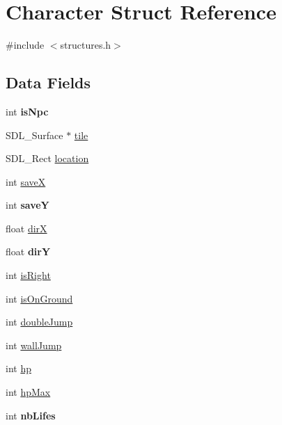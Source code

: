\hypertarget{struct_character}{\section{Character Struct Reference}
\label{struct_character}
}


{\ttfamily \#include $<$structures.\-h$>$}

\subsection*{Data Fields}
\begin{DoxyCompactItemize}
\item 
\hypertarget{struct_character_a9ffc306de2b2ce522b1d1908accd5938}{int {\bfseries is\-Npc}}\label{struct_character_a9ffc306de2b2ce522b1d1908accd5938}

\item 
S\-D\-L\-\_\-\-Surface $\ast$ \hyperlink{struct_character_a36a8f1f7bc9c241b9926d97b82811407}{tile}
\item 
S\-D\-L\-\_\-\-Rect \hyperlink{struct_character_a08e7ab1c2395b84bea7ca13eb99bac60}{location}
\item 
int \hyperlink{struct_character_a72c195fb4fffc6a9267fffce902bf641}{save\-X}
\item 
\hypertarget{struct_character_a5cb5844063a443a2bc538124f0709b13}{int {\bfseries save\-Y}}\label{struct_character_a5cb5844063a443a2bc538124f0709b13}

\item 
float \hyperlink{struct_character_ab1761c91e3594dec827fe60e992d2e1a}{dir\-X}
\item 
\hypertarget{struct_character_a72324d3d2f391a353c57aaa03b148d8d}{float {\bfseries dir\-Y}}\label{struct_character_a72324d3d2f391a353c57aaa03b148d8d}

\item 
int \hyperlink{struct_character_ac73a92163fd55152d03d0aaca5093b72}{is\-Right}
\item 
int \hyperlink{struct_character_aa4061d19d285d0ef281f333dee8f9a00}{is\-On\-Ground}
\item 
int \hyperlink{struct_character_a917917ad1fee47a2101d4ece8dbd33e8}{double\-Jump}
\item 
int \hyperlink{struct_character_aa7fe887a46ee52d925d7b5871e78a202}{wall\-Jump}
\item 
int \hyperlink{struct_character_a9aa790f93d2d067a4f5608fdb8409f94}{hp}
\item 
int \hyperlink{struct_character_a3bf25d4c62de464729fb3409d2a3d194}{hp\-Max}
\item 
\hypertarget{struct_character_ae4069fd5e08497b888237e5eb9f2e4ad}{int {\bfseries nb\-Lifes}}\label{struct_character_ae4069fd5e08497b888237e5eb9f2e4ad}


\end{DoxyCompactItemize}
